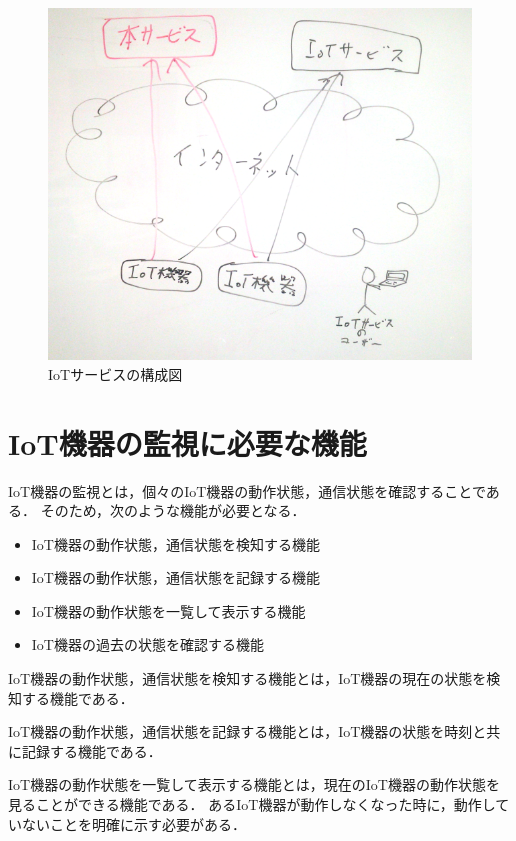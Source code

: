 \begin{figure}[htbp]
\includegraphics[width=14cm]{images/proposal_system.png}
\caption{IoTサービスの構成図}
\label{fig:proposal_system}
\end{figure}


\section{IoT機器の監視に必要な機能}%
IoT機器の監視とは，個々のIoT機器の動作状態，通信状態を確認することである．
そのため，次のような機能が必要となる．
\begin{itemize}
	\item IoT機器の動作状態，通信状態を検知する機能
	\item IoT機器の動作状態，通信状態を記録する機能
	\item IoT機器の動作状態を一覧して表示する機能
	\item IoT機器の過去の状態を確認する機能
\end{itemize}

IoT機器の動作状態，通信状態を検知する機能とは，IoT機器の現在の状態を検知する機能である．

IoT機器の動作状態，通信状態を記録する機能とは，IoT機器の状態を時刻と共に記録する機能である．

IoT機器の動作状態を一覧して表示する機能とは，現在のIoT機器の動作状態を見ることができる機能である．
あるIoT機器が動作しなくなった時に，動作していないことを明確に示す必要がある．
\medskip

